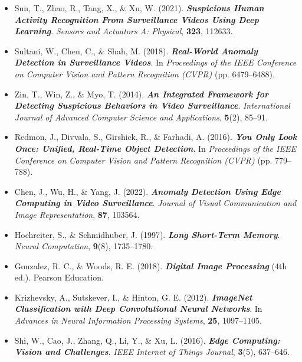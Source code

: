 \documentclass[listof=nochaptergap,12pt,times,authoryear]{report}
\begin{document}
\begin{itemize}
    \item Sun, T., Zhao, R., Tang, X., \& Xu, W. (2021). \textbf{\textit{Suspicious Human Activity Recognition From Surveillance Videos Using Deep Learning}}. \textit{Sensors and Actuators A: Physical}, \textbf{323}, 112633.

    \item Sultani, W., Chen, C., \& Shah, M. (2018). \textbf{\textit{Real-World Anomaly Detection in Surveillance Videos}}. In \textit{Proceedings of the IEEE Conference on Computer Vision and Pattern Recognition (CVPR)} (pp. 6479--6488).

    \item Zin, T., Win, Z., \& Myo, T. (2014). \textbf{\textit{An Integrated Framework for Detecting Suspicious Behaviors in Video Surveillance}}. \textit{International Journal of Advanced Computer Science and Applications}, \textbf{5}(2), 85--91.

    \item Redmon, J., Divvala, S., Girshick, R., \& Farhadi, A. (2016). \textbf{\textit{You Only Look Once: Unified, Real-Time Object Detection}}. In \textit{Proceedings of the IEEE Conference on Computer Vision and Pattern Recognition (CVPR)} (pp. 779--788).

    \item Chen, J., Wu, H., \& Yang, J. (2022). \textbf{\textit{Anomaly Detection Using Edge Computing in Video Surveillance}}. \textit{Journal of Visual Communication and Image Representation}, \textbf{87}, 103564.

    \item Hochreiter, S., \& Schmidhuber, J. (1997). \textbf{\textit{Long Short-Term Memory}}. \textit{Neural Computation}, \textbf{9}(8), 1735--1780.

    \item Gonzalez, R. C., \& Woods, R. E. (2018). \textbf{\textit{Digital Image Processing}} (4th ed.). Pearson Education.

    \item Krizhevsky, A., Sutskever, I., \& Hinton, G. E. (2012). \textbf{\textit{ImageNet Classification with Deep Convolutional Neural Networks}}. In \textit{Advances in Neural Information Processing Systems}, \textbf{25}, 1097--1105.

    \item Shi, W., Cao, J., Zhang, Q., Li, Y., \& Xu, L. (2016). \textbf{\textit{Edge Computing: Vision and Challenges}}. \textit{IEEE Internet of Things Journal}, \textbf{3}(5), 637--646.


\end{itemize}
\end{document}
